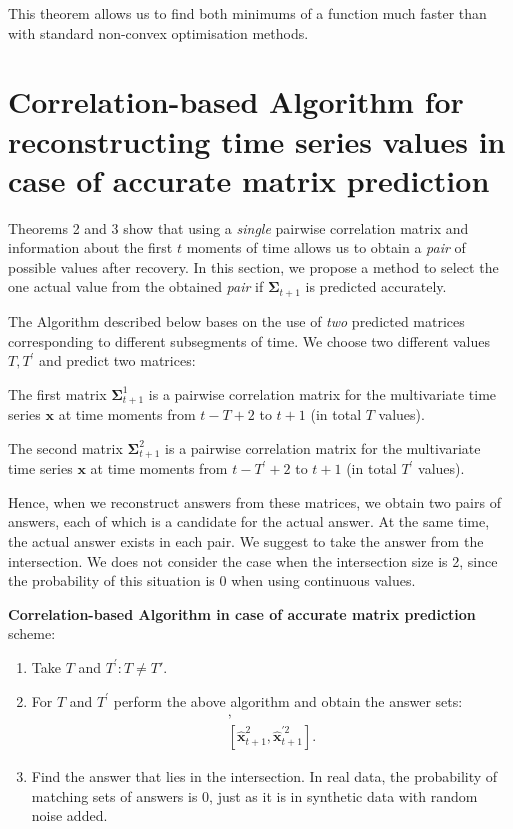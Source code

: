 \documentclass[12pt]{article}
\begin{document}
{This theorem allows us to find both minimums of a function much faster than with standard non-convex optimisation methods.

\section{Correlation-based Algorithm for reconstructing time series values in case of accurate matrix prediction}

Theorems 2 and 3 show that using a \emph{single} pairwise correlation matrix and information about the first $t$ moments of time allows us to obtain a \emph{pair} of possible values after recovery. In this section, we propose a method to select the one actual value from the obtained \emph{pair} if $\mathbf{\Sigma}_{t+1}$ is predicted accurately.

The Algorithm described below bases on the use of \emph{two} predicted matrices corresponding to different subsegments of time. We choose two different values $T, T^\prime$ and predict two matrices:

The first matrix $\mathbf{\Sigma}_{t+1}^1$ is a pairwise correlation matrix for the multivariate time series $\mathbf{x}$ at time moments from $t-T+2$ to $t+1$ (in total $T$ values).

The second matrix $\mathbf{\Sigma}_{t+1}^2$ is a pairwise correlation matrix for the multivariate time series $\mathbf{x}$ at time moments from $t-T^\prime+2$ to $t+1$ (in total $T^\prime$ values).

Hence, when we reconstruct answers from these matrices, we obtain two pairs of answers, each of which is a candidate for the actual answer. At the same time, the actual answer exists in each pair. We suggest to take the answer from the intersection. We does not consider the case when the intersection size is 2, since the probability of this situation is 0 when using continuous values.

\textbf{Correlation-based Algorithm in case of accurate matrix prediction} scheme:
\begin{enumerate}
	\item Take $T$ and $T^\prime: T \neq T'$.
	\item For $T$ and $T^\prime$ perform the above algorithm and obtain the answer sets: 
	\begin{gather*}
	 [\hat{\mathbf{x}}_{t+1}^1, \hat{\mathbf{x}}^{\prime 1}_{t+1}],\\ [\hat{\mathbf{x}}_{t+1}^2, \hat{\mathbf{x}}^{\prime 2}_{t+1}].
	 \end{gather*}
	\item Find the answer that lies in the intersection.
	In real data, the probability of matching sets of answers is 0, just as it is in synthetic data with random noise added.
\end{enumerate}

}
\end{document}
